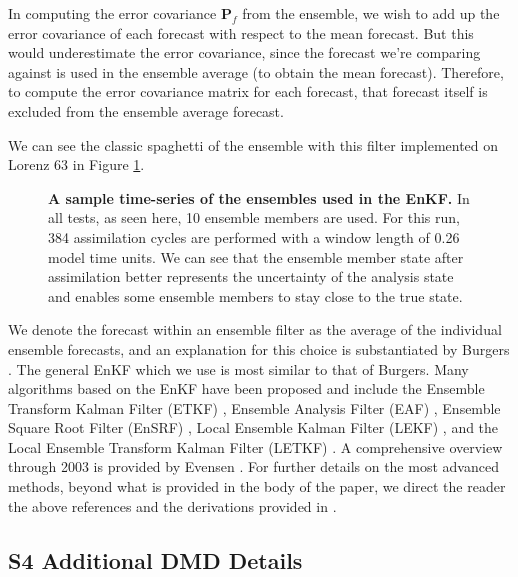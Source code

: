 \documentclass[10pt,letterpaper]{article}
\newcommand{\mbP}{\mathbf{P}}
\begin{document}
In computing the error covariance $\mbP_f$ from the ensemble, we wish to add up the error covariance of each forecast with respect to the mean forecast. 
But this would underestimate the error covariance, since the forecast we're comparing against is used in the ensemble average (to obtain the mean forecast).
Therefore, to compute the error covariance matrix for each forecast, that forecast itself is excluded from the ensemble average forecast.

We can see the classic spaghetti of the ensemble with this filter implemented on Lorenz 63 in Figure \ref{fig:spaghetti}.

\begin{figure}[h]
  \centering
  \caption[A sample time-series of the ensembles used in the EnKF]{
\textbf{    A sample time-series of the ensembles used in the EnKF.
}    In all tests, as seen here, 10 ensemble members are used.
    For this run, 384 assimilation cycles are performed with a window length of 0.26 model time units.
    We can see that the ensemble member state after assimilation better represents the uncertainty of the analysis state and enables some ensemble members to stay close to the true state.
  }
  \label{fig:spaghetti}
\end{figure}

We denote the forecast within an ensemble filter as the average of the individual ensemble forecasts, and an explanation for this choice is substantiated by Burgers \cite{burgers1998analysis}.
The general EnKF which we use is most similar to that of Burgers.
Many algorithms based on the EnKF have been proposed and include the Ensemble Transform Kalman Filter (ETKF) \cite{ott2004local}, Ensemble Analysis Filter (EAF) \cite{anderson2001new}, Ensemble Square Root Filter (EnSRF) \cite{tippett2003ensemble}, Local Ensemble Kalman Filter (LEKF) \cite{ott2004local}, and the Local Ensemble Transform Kalman Filter (LETKF) \cite{hunt2007efficient}.
A comprehensive overview through 2003 is provided by Evensen \cite{evensen2003ensemble}.
For further details on the most advanced methods, beyond what is provided in the body of the paper, we direct the reader the above references and the derivations provided in \cite{reagan2013}.

\clearpage
\pagebreak
\subsection*{S4 Additional DMD Details}
\label{S4}
\end{document}
